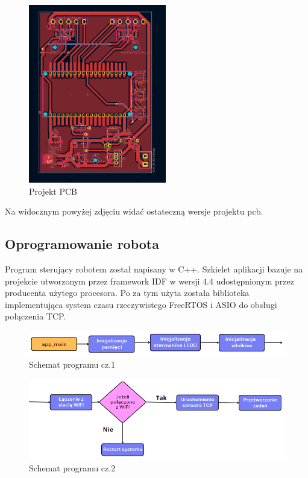 \begin{figure}[H]
	\centering
	\includegraphics[width=6cm]{pages/robot/zdjecia/kicad/kiCad_PCB.png}
	\caption{Projekt PCB}
	\label{Fig:Rysunek}
\end{figure}
Na widocznym powyżej zdjęciu widać ostateczną wersje projektu pcb.


\subsection{Oprogramowanie robota}

Program sterujący robotem został napisany w C++. 
Szkielet aplikacji bazuje na projekcie utworzonym przez framework IDF w wersji 4.4 udostępnionym 
przez producenta użytego procesora. Po za tym użyta została biblioteka implementująca 
system czasu rzeczywistego FreeRTOS i ASIO do obsługi połączenia TCP. 
\begin{figure}[H]
	\centering
	\includegraphics[width=14cm]{pages/robot/zdjecia/schematy/softSchematCz1.png}
	\caption{Schemat programu cz.1 }
	\label{Fig:Rysunek}
\end{figure}
\begin{figure}[H]
	\centering
	\includegraphics[width=14cm]{pages/robot/zdjecia/schematy/softSchematCz2.png}
	\caption{Schemat programu cz.2}
	\label{Fig:Rysunek}
\end{figure}

